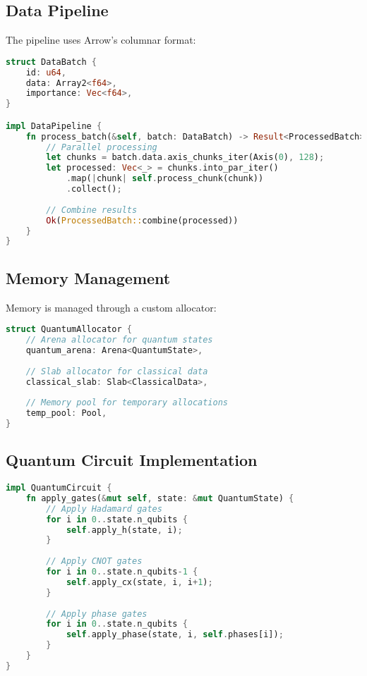 \documentclass[10pt,twocolumn]{article}
\begin{document}
\subsection{Data Pipeline}
The pipeline uses Arrow's columnar format:

\begin{lstlisting}[language=rust]
struct DataBatch {
    id: u64,
    data: Array2<f64>,
    importance: Vec<f64>,
}

impl DataPipeline {
    fn process_batch(&self, batch: DataBatch) -> Result<ProcessedBatch> {
        // Parallel processing
        let chunks = batch.data.axis_chunks_iter(Axis(0), 128);
        let processed: Vec<_> = chunks.into_par_iter()
            .map(|chunk| self.process_chunk(chunk))
            .collect();
        
        // Combine results
        Ok(ProcessedBatch::combine(processed))
    }
}
\end{lstlisting}

\subsection{Memory Management}
Memory is managed through a custom allocator:

\begin{lstlisting}[language=rust]
struct QuantumAllocator {
    // Arena allocator for quantum states
    quantum_arena: Arena<QuantumState>,
    
    // Slab allocator for classical data
    classical_slab: Slab<ClassicalData>,
    
    // Memory pool for temporary allocations
    temp_pool: Pool,
}
\end{lstlisting}

\subsection{Quantum Circuit Implementation}
\begin{lstlisting}[language=rust]
impl QuantumCircuit {
    fn apply_gates(&mut self, state: &mut QuantumState) {
        // Apply Hadamard gates
        for i in 0..state.n_qubits {
            self.apply_h(state, i);
        }
        
        // Apply CNOT gates
        for i in 0..state.n_qubits-1 {
            self.apply_cx(state, i, i+1);
        }
        
        // Apply phase gates
        for i in 0..state.n_qubits {
            self.apply_phase(state, i, self.phases[i]);
        }
    }
}
\end{lstlisting}
\end{document}
